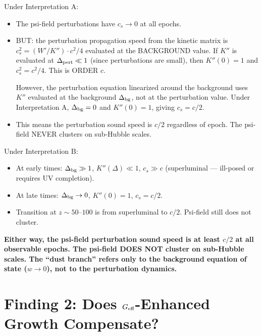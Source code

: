 \documentclass[11pt]{article}
\newcommand{\Geff}{G_{\rm eff}}
\begin{document}
Under Interpretation A:
\begin{itemize}[nosep]
\item The psi-field perturbations have $c_s \to 0$ at all epochs.
\item BUT: the perturbation propagation speed from the kinetic matrix
  is $c_s^2 = (W'/K'') \cdot c^2/4$ evaluated at the BACKGROUND
  value. If $K''$ is evaluated at $\Delta_{\rm pert} \ll 1$ (since
  perturbations are small), then $K''(0) = 1$ and $c_s^2 = c^2/4$.
  This is ORDER $c$.

  However, the perturbation equation linearized around the background
  uses $K''$ evaluated at the background $\Delta_{\rm bg}$, not at
  the perturbation value. Under Interpretation A, $\Delta_{\rm bg} = 0$
  and $K''(0) = 1$, giving $c_s = c/2$.
\item This means the perturbation sound speed is $c/2$ regardless of
  epoch. The psi-field NEVER clusters on sub-Hubble scales.
\end{itemize}

Under Interpretation B:
\begin{itemize}[nosep]
\item At early times: $\Delta_{\rm bg} \gg 1$, $K''(\Delta) \ll 1$,
  $c_s \gg c$ (superluminal --- ill-posed or requires UV completion).
\item At late times: $\Delta_{\rm bg} \to 0$, $K''(0) = 1$,
  $c_s = c/2$.
\item Transition at $z \sim 50$--$100$ is from superluminal to $c/2$.
  Psi-field still does not cluster.
\end{itemize}

\textbf{Either way, the psi-field perturbation sound speed is at least
$c/2$ at all observable epochs. The psi-field DOES NOT cluster on
sub-Hubble scales. The ``dust branch'' refers only to the background
equation of state ($w \to 0$), not to the perturbation dynamics.}


\part{Finding 2: Does $\Geff$-Enhanced Growth Compensate?}
\label{part:geff}
\end{document}
